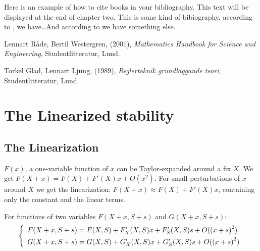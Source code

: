 \documentclass[a4paper, 10pt, twoside, openright]{book}
\begin{document}
%
Here is an example of how to cite books in your bibliography. This
text will be displayed at the end of chapter two. This is some kind of
bibiography, according to \cite{beta}, we have\ldots And according to
\cite{beta,Glad} we have something else.

\begin{thebibliography}{99}

Lennart Råde, Bertil Westergren, 
(2001), 
\emph{Mathematics Handbook for Science and Engineering},
Studentlitteratur, 
Lund.

Torkel Glad, Lennart Ljung,
(1989), 
\emph{Reglerteknik grundläggande teori},
Studentlitteratur, 
Lund.

\end{thebibliography}


\appendix

\chapter{The Linearized stability}

\section{The Linearization}

$F(x)$, a one-variable function of $x$ can be Taylor-expanded
around a fix $X$. We get $F(X+x)=F(X) + F'(X) x + O({x}^{2})$.
For small perturbations of $x$ around $X$ we get the linearization:
$F(X+x) \approx F(X) + F'(X) x$, containing only the
constant and the linear terms.

For functions of two variables $F(X+x,S+s)$ and $G(X+x,S+s)$:
\begin{displaymath} 
\left\{ \begin{array}{l}
F(X+x,S+s)= F(X,S) + {F}_{X}'(X,S)x + {F}_{S}'(X,S)s + O({(x+s)}^{2})\\
G(X+x,S+s)= G(X,S) + {G}_{X}'(X,S)x + {G}_{S}'(X,S)s + O({(x+s)}^{2})
\rule{0pt}{3ex} 
\end{array}\right. 
\end{displaymath}
\end{document}
